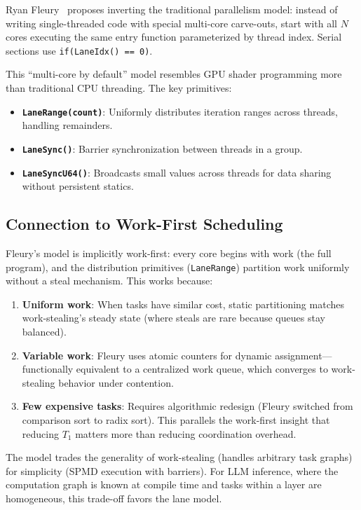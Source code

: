 \documentclass[11pt,letterpaper]{article}
\begin{document}
Ryan Fleury~\cite{fleury2025multicore} proposes inverting the traditional parallelism model: instead of writing single-threaded code with special multi-core carve-outs, start with all $N$ cores executing the same entry function parameterized by thread index. Serial sections use \texttt{if(LaneIdx() == 0)}.

This ``multi-core by default'' model resembles GPU shader programming more than traditional CPU threading. The key primitives:

\begin{itemize}
    \item \textbf{\texttt{LaneRange(count)}}: Uniformly distributes iteration ranges across threads, handling remainders.
    \item \textbf{\texttt{LaneSync()}}: Barrier synchronization between threads in a group.
    \item \textbf{\texttt{LaneSyncU64()}}: Broadcasts small values across threads for data sharing without persistent statics.
\end{itemize}

\subsection{Connection to Work-First Scheduling}

Fleury's model is implicitly work-first: every core begins with work (the full program), and the distribution primitives (\texttt{LaneRange}) partition work uniformly without a steal mechanism. This works because:

\begin{enumerate}
    \item \textbf{Uniform work}: When tasks have similar cost, static partitioning matches work-stealing's steady state (where steals are rare because queues stay balanced).
    \item \textbf{Variable work}: Fleury uses atomic counters for dynamic assignment---functionally equivalent to a centralized work queue, which converges to work-stealing behavior under contention.
    \item \textbf{Few expensive tasks}: Requires algorithmic redesign (Fleury switched from comparison sort to radix sort). This parallels the work-first insight that reducing $T_1$ matters more than reducing coordination overhead.
\end{enumerate}

The model trades the generality of work-stealing (handles arbitrary task graphs) for simplicity (SPMD execution with barriers). For LLM inference, where the computation graph is known at compile time and tasks within a layer are homogeneous, this trade-off favors the lane model.
\end{document}
